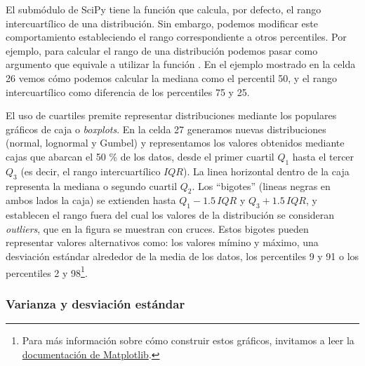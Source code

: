 El submódulo  de SciPy tiene la función  que calcula, por defecto, el rango intercuartílico de una distribución. Sin embargo, podemos modificar este comportamiento estableciendo el rango correspondiente a otros percentiles. Por ejemplo, para calcular el rango de una distribución podemos pasar como argumento  que equivale a utilizar la función . En el ejemplo mostrado en la celda 26 vemos cómo podemos calcular la mediana como el percentil 50, y el rango intercuartílico como diferencia de los percentiles 75 y 25.


El uso de cuartiles premite representar distribuciones mediante los populares gráficos de caja o \textit{boxplots}. En la celda 27 generamos nuevas distribuciones (normal, lognormal y Gumbel) y representamos los valores obtenidos mediante cajas que abarcan el 50 \% de los datos, desde el primer cuartil $Q_1$ hasta el tercer $Q_3$ (es decir, el rango intercuartílico $IQR$). La linea horizontal dentro de la caja representa la mediana o  segundo cuartil $Q_2$. Los ``bigotes'' (lineas negras en ambos lados la caja) se extienden hasta $Q_1 - 1.5 \, IQR$ y $Q_3 + 1.5 \, IQR$, y establecen el rango fuera del cual los valores de la distribución se consideran \textit{outliers}, que en la figura se muestran con cruces. Estos bigotes pueden representar valores alternativos como: los valores mímino y máximo, una desviación estándar alrededor de la media de los datos, los percentiles 9 y 91 o los percentiles 2 y 98\footnote{Para más información sobre cómo construir estos gráficos, invitamos a leer la \href{https://matplotlib.org/stable/api/\_as\_gen/matplotlib.pyplot.boxplot.html}{documentación de Matplotlib}.}.





\subsubsection{Varianza y desviación estándar}

